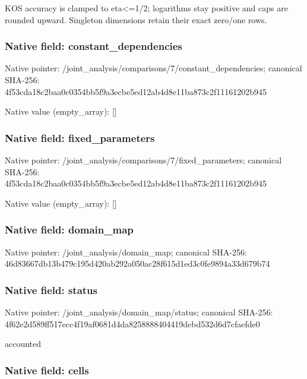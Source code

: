 \documentclass[10pt,a4paper]{article}
\begin{document}
KOS accuracy is clamped to eta<=1/2; logarithms stay positive and caps are rounded upward. Singleton dimensions retain their exact zero/one rows.


\subsubsection{Native field: constant\_dependencies}


Native pointer: /joint\_analysis/comparis\allowbreak{}ons/7/constant\_dependenc\allowbreak{}ies; canonical SHA-256: 4f53cda18c2baa0c0354bb5f\allowbreak{}9a3ecbe5ed12ab4d8e11ba87\allowbreak{}3c2f11161202b945



Native value (empty\_array): []



\subsubsection{Native field: fixed\_parameters}


Native pointer: /joint\_analysis/comparis\allowbreak{}ons/7/fixed\_parameters; canonical SHA-256: 4f53cda18c2baa0c0354bb5f\allowbreak{}9a3ecbe5ed12ab4d8e11ba87\allowbreak{}3c2f11161202b945



Native value (empty\_array): []



\subsubsection{Native field: domain\_map}


Native pointer: /joint\_analysis/domain\_map; canonical SHA-256: 46d83667db13b479c195d420\allowbreak{}ab292a050ac28f615d1ed3c0\allowbreak{}fe9894a33d679b74



\subsubsection{Native field: status}


Native pointer: /joint\_analysis/domain\_map/status; canonical SHA-256: 4f62e2d589ff517ecc4f19af\allowbreak{}0681d4da8258888404419deb\allowbreak{}d532d6d7cfaefde0


accounted


\subsubsection{Native field: cells}
\end{document}

